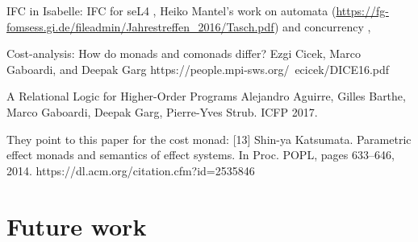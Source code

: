 \documentclass[sigplan,screen]{acmart}\settopmatter{}
\newcommand\fstar{F$^\star$\xspace}
\newcommand{\comm}[3]{\ifcheckpagebudget\else\ifdraft{\maybecolor{#1}[#2: #3]}\fi\fi}
\newcommand{\ch}[1]{\comm{teal}{CH}{#1}}
\newcommand{\km}[1]{\comm{purple}{KM}{#1}}
\newcommand*{\EG}{e.g.,\xspace}
\begin{document}

\iflater
IFC in Isabelle:
IFC for seL4 \cite{MurrayMBGBSLGK13},
Heiko Mantel's work on automata
(\href{I-MAKS}{https://fg-fomsess.gi.de/fileadmin/Jahrestreffen\_2016/Tasch.pdf})
and concurrency \cite{GreweLMS14, GreweLMS14a, GreweMS14},
\fi

\iflater

Cost-analysis: How do monads and comonads differ?
Ezgi Cicek, Marco Gaboardi, and Deepak Garg
https://people.mpi-sws.org/~ecicek/DICE16.pdf

A Relational Logic for Higher-Order Programs
Alejandro Aguirre, Gilles Barthe, Marco Gaboardi, Deepak Garg,
Pierre-Yves Strub.  ICFP 2017. \cite{AguirreBGGS17}

They point to this paper for the cost monad:
[13] Shin-ya Katsumata. Parametric effect monads
and semantics of effect systems. In Proc. POPL,
pages 633–646, 2014.
https://dl.acm.org/citation.cfm?id=2535846
\fi

\iffull
\section{Future work}
\label{sec:discussion}


\end{document}
